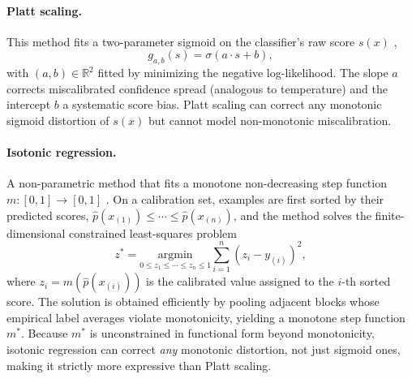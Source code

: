 \paragraph{Platt scaling.} This method fits a two-parameter sigmoid on the classifier's raw score $s(x)$ \citep{platt1999probabilistic,niculescuMizil2005predicting},
\begin{equation}\label{eq:platt_scaling}
    g_{a,b}(s) = \sigma\!\left(a \cdot s + b\right),
\end{equation}
with $(a, b) \in \mathbb{R}^2$ fitted by minimizing the negative log-likelihood. The slope $a$ corrects miscalibrated confidence spread (analogous to temperature) and the intercept $b$ a systematic score bias. Platt scaling can correct any monotonic sigmoid distortion of $s(x)$ but cannot model non-monotonic miscalibration.

\paragraph{Isotonic regression.} A non-parametric method that fits a monotone non-decreasing step function $m: [0,1] \to [0,1]$ \citep{zadrozny2002transforming}. On a calibration set, examples are first sorted by their predicted scores,
$\hat p(x_{(1)}) \le \cdots \le \hat p(x_{(n)})$, and the method solves the finite-dimensional constrained least-squares problem
\begin{equation}\label{eq:isotonic}
    z^* = \underset{0 \le z_1 \le \cdots \le z_n \le 1}{\mathrm{argmin}}
    \sum_{i=1}^{n} (z_i - y_{(i)})^2,
\end{equation}
where $z_i = m(\hat p(x_{(i)}))$ is the calibrated value assigned to the $i$-th sorted score. The solution is obtained efficiently by pooling adjacent blocks whose empirical label averages violate monotonicity, yielding a monotone step function $m^*$. Because $m^*$ is unconstrained in functional form beyond monotonicity, isotonic regression can correct \textit{any} monotonic distortion, not just sigmoid ones, making it strictly more expressive than Platt scaling.

